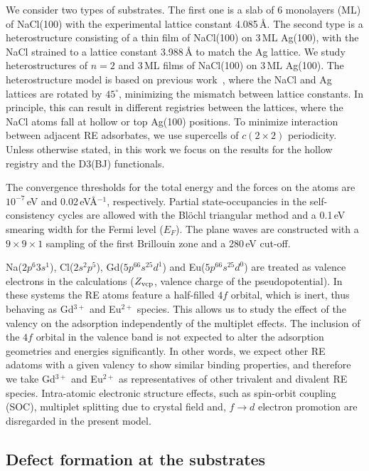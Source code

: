 {We consider two types of substrates. The first one is a slab of 6 monolayers (ML) of NaCl(100) with the experimental lattice constant 4.085\,{\AA}.  The second type is a heterostructure consisting of a thin film of NaCl(100) on 3\,ML Ag(100), with the NaCl strained to a lattice constant 3.988\,{\AA} to match the Ag lattice. We study heterostructures of  $n=2$ and $3$\,ML films of NaCl(100) on 3\,ML Ag(100). The heterostructure model is based on previous work~\cite{bib:pivetta05},  where the NaCl and Ag lattices are rotated by $45^\circ$, minimizing the mismatch between lattice constants.
In principle, this can result in different registries between the lattices, where the NaCl atoms fall at hollow or top Ag(100) positions. To minimize interaction between adjacent RE adsorbates, we use supercells of $c(2\times2)$ periodicity. Unless otherwise stated, in this work we focus on the results for the hollow registry and the D3(BJ) functionals.

The convergence thresholds for the total energy and the forces on the atoms are $10^{-7}$\,eV and 0.02\,eV{\AA}$^{-1}$, respectively. Partial state-occupancies in the self-consistency cycles are allowed with the Bl\"ochl triangular method \cite{bib:blochl94} and a 0.1\,eV smearing width for the Fermi level ($E_F$). The plane waves are constructed with a $9\times9\times1$ sampling of the
first Brillouin zone \cite{bib:monk76} and a 280\,eV cut-off.

Na($2p^6 3s^1$), Cl($2s^2p^5$), Gd($5p^66s^25d^1$) and Eu($5p^66s^25d^0$)
are treated as valence electrons in the calculations ($Z_{\rm vcp}$, valence charge of the pseudopotential).
In these systems the RE atoms feature a half-filled
$4f$ orbital, which is inert, thus behaving as Gd$^{3+}$ and Eu$^{2+}$ species.
This allows us to study the effect of the valency on the adsorption
independently of the multiplet effects.
The inclusion of the $4f$ orbital in the valence band is not expected to
alter the adsorption geometries and energies significantly.
In other words, we expect other RE adatoms with a given valency to show
similar binding properties, and therefore we take Gd$^{3+}$ and Eu$^{2+}$ as
representatives of other trivalent and divalent RE species.
Intra-atomic electronic structure effects, such as spin-orbit coupling (SOC),
multiplet splitting due to crystal field and, $f \to d$ electron promotion are disregarded in the present model.


\subsection{Defect formation at the substrates}

}
